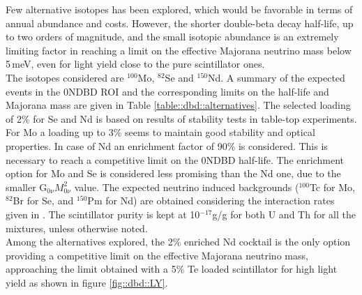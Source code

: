 Few alternative isotopes has been explored, which would be favorable in terms of annual abundance and costs. However, the shorter double-beta decay half-life, up to two orders of magnitude, and the small isotopic abundance is an extremely limiting factor in reaching a limit on the effective Majorana neutrino mass below 5\,meV, even for light yield close to the pure scintillator ones.\\

The isotopes considered are $^{100}$Mo, $^{82}$Se and $^{150}$Nd. A summary of the expected events in the 0NDBD ROI and the corresponding limits on the half-life and Majorana mass are given in Table \ref{table::dbd::alternatives}. The selected loading of 2\% for Se and Nd is based on results of stability tests in table-top experiments. For Mo a loading up to 3\% seems to maintain good stability and optical properties. In case of Nd an enrichment factor of 90\% is considered. This is necessary to reach a competitive limit on the 0NDBD half-life. The enrichment option for Mo and Se is considered less promising than the Nd one, due to the smaller G$_{0\nu} M^{2}_{0\nu}$ value. The expected neutrino induced backgrounds ($^{100}$Tc for Mo, $^{82}$Br for Se, and $^{150}$Pm for Nd) are obtained considering the interaction rates given in \cite{eijiri14, eijiri17}. The scintillator purity is kept at 10$^{-17}$g/g for both U and Th for all the mixtures, unless otherwise noted.\\

Among the alternatives explored, the 2\% enriched Nd cocktail is the only option providing a competitive limit on the effective Majorana neutrino mass, approaching the limit obtained with a 5\% Te loaded scintillator for high light yield as shown in figure \ref{fig::dbd::LY}.


